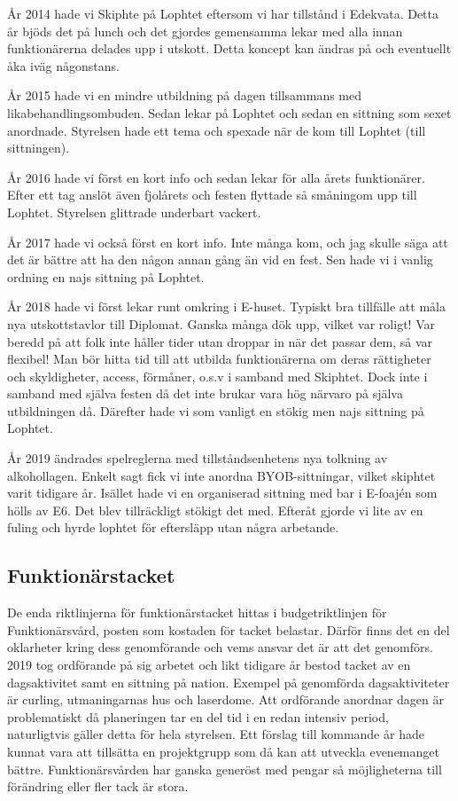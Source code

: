 \documentclass[10pt]{article}
\begin{document}
    År 2014 hade vi Skiphte på Lophtet eftersom vi har tillstånd i Edekvata. Detta år bjöds det på lunch och det gjordes gemensamma lekar med alla innan funktionärerna delades upp i utskott. Detta koncept kan ändras på och eventuellt åka iväg någonstans.
    
    År 2015 hade vi en mindre utbildning på dagen tillsammans med likabehandlingsombuden. Sedan lekar på Lophtet och sedan en sittning som sexet anordnade. Styrelsen hade ett tema och spexade när de kom till Lophtet (till sittningen).
    
    År 2016 hade vi först en kort info och sedan lekar för alla årets funktionärer. Efter ett tag anslöt även fjolårets och festen flyttade så småningom upp till Lophtet. Styrelsen glittrade underbart vackert.
    
    År 2017 hade vi också först en kort info. Inte många kom, och jag skulle säga att det är bättre att ha den någon annan gång än vid en fest. Sen hade vi i vanlig ordning en najs sittning på Lophtet.
    
    År 2018 hade vi först lekar runt omkring i E-huset. Typiskt bra tillfälle att måla nya utskottstavlor till Diplomat. Ganska många dök upp, vilket var roligt! Var beredd på att folk inte håller tider utan droppar in när det passar dem, så var flexibel! Man bör hitta tid till att utbilda funktionärerna om deras rättigheter och skyldigheter, access, förmåner, o.s.v i samband med Skiphtet. Dock inte i samband med själva festen då det inte brukar vara hög närvaro på själva utbildningen då. Därefter hade vi som vanligt en stökig men najs sittning på Lophtet.
    
    År 2019 ändrades spelreglerna med tillståndsenhetens nya tolkning av alkohollagen. Enkelt sagt fick vi inte anordna BYOB-sittningar, vilket skiphtet varit tidigare år. Isället hade vi en organiserad sittning med bar i E-foajén som hölls av E6. Det blev tillräckligt stökigt det med. Efteråt gjorde vi lite av en fuling och hyrde lophtet för eftersläpp utan några arbetande.

    \subsection{Funktionärstacket}
    
    De enda riktlinjerna för funktionärstacket hittas i budgetriktlinjen för Funktionärsvård, posten som kostaden för tacket belastar. Därför finns det en del oklarheter kring dess genomförande och vems ansvar det är att det genomförs. 2019 tog ordförande på sig arbetet och likt tidigare år bestod tacket av en dagsaktivitet samt en sittning på nation. Exempel på genomförda dagsaktiviteter är curling, utmaningarnas hus och laserdome. Att ordförande anordnar dagen är problematiskt då planeringen tar en del tid i en redan intensiv period, naturligtvis gäller detta för hela styrelsen. Ett förslag till kommande år hade kunnat vara att tillsätta en projektgrupp som då kan att utveckla evenemanget bättre. Funktionärsvården har ganska generöst med pengar så möjligheterna till förändring eller fler tack är stora. 
\end{document}
